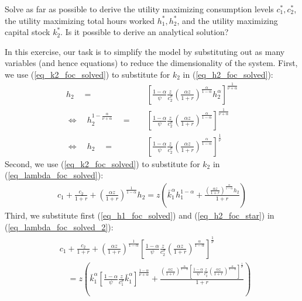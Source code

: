 \documentclass[a4paper, 12pt]{article}
\begin{document}
\begin{Exercise}%
	Solve as far as possible to derive the utility maximizing consumption levels $c_1^*, c_2^*$, the utility maximizing total hours worked $h_1^*,h_2^*$, and the utility maximizing capital stock $k_2^*$. Is it possible to derive an analytical solution?%
\end{Exercise}%
\begin{Answer}%
	In this exercise, our task is to simplify the model by substituting out as many variables (and hence equations) to reduce the dimensionality of the system. First, we use (\ref{eq_k2_foc_solved}) to substitute for $k_2$ in (\ref{eq_h2_foc_solved}):
		 \begin{align}
			 h_2 \quad = & \quad \left[\frac{1-\alpha}{\psi}\frac{z}{c_2^\sigma}\left(\frac{\alpha z}{1+r}\right)^{\frac{\alpha}{1-\alpha}} h_2^\alpha\right]^{\frac{1}{\nu+\alpha}}\nonumber\\
			 \Leftrightarrow \quad h_2^{1-\frac{\alpha}{\nu+\alpha}} \quad = & \quad \left[\frac{1-\alpha}{\psi}\frac{z}{c_2^\sigma}\left(\frac{\alpha z}{1+r}\right)^{\frac{\alpha}{1-\alpha}} \right]^{\frac{1}{\nu+\alpha}}\nonumber\\
			 \Leftrightarrow \quad h_2 \quad = & \quad \left[\frac{1-\alpha}{\psi}\frac{z}{c_2^\sigma}\left(\frac{\alpha z}{1+r}\right)^{\frac{\alpha}{1-\alpha}} \right]^{\frac{1}{\nu}}\label{eq_h2_foc_star}
		 \end{align}
		 Second, we use  (\ref{eq_k2_foc_solved}) to substitute for $k_2$ in (\ref{eq_lambda_foc_solved}):
		 \begin{align}
			c_1 + \frac{c_2}{1+r} + \left(\frac{\alpha z}{1+r}\right)^{\frac{1}{1-\alpha}} h_2 = z \left(\bar{k}_1^\alpha h_1^{1-\alpha} + \frac{\left(\frac{\alpha z}{1+r}\right)^{\frac{\alpha}{1-\alpha}} h_2}{1+r} \right)\label{eq_lambda_foc_solved_2}
		 \end{align}
		 Third, we substitute first (\ref{eq_h1_foc_solved}) and (\ref{eq_h2_foc_star}) in (\ref{eq_lambda_foc_solved_2}):
		 \begin{align}
			\begin{split}
				& c_1 + \frac{c_2}{1+r} + \left(\frac{\alpha z}{1+r}\right)^{\frac{1}{1-\alpha}} \left[\frac{1-\alpha}{\psi}\frac{z}{c_2^\sigma}\left(\frac{\alpha z}{1+r}\right)^{\frac{\alpha}{1-\alpha}} \right]^{\frac{1}{\nu}}\\
				& \quad = z \left(\bar{k}_1^\alpha \left[\frac{1-\alpha}{\psi} \frac{z}{c_1^\sigma} \bar{k}_1^\alpha\right]^{\frac{1-\alpha}{\nu+\alpha}} + \frac{\left(\frac{\alpha z}{1+r}\right)^{\frac{\alpha}{1-\alpha}} \left[\frac{1-\alpha}{\psi}\frac{z}{c_2^\sigma}\left(\frac{\alpha z}{1+r}\right)^{\frac{\alpha}{1-\alpha}} \right]^{\frac{1}{\nu}}}{1+r} \right)\label{eq_lambda_foc_solved_3}

\end{split}
\end{align}
\end{Answer}
\end{document}
